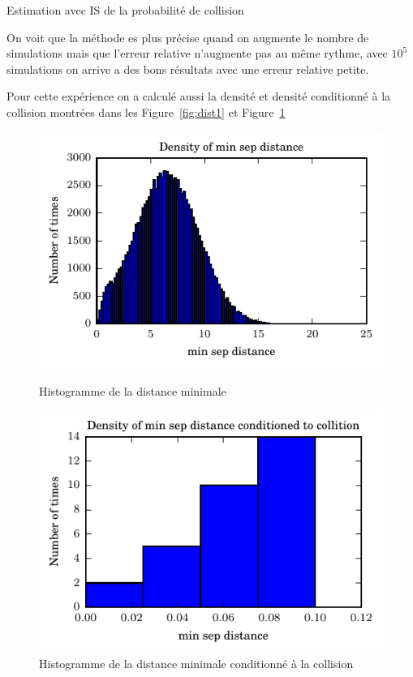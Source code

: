 \documentclass[a4paper, 12pt,twoside]{article}
\numberwithin{equation}{subsection}
\newlength{\mylength}
\begin{document}
	\begin{table}[htbp]
		\begin{center}
		\end{center}
		\caption{Estimation avec IS de la probabilité de collision}
		\label{tab:Isobl}
	\end{table}
	
	On voit que la méthode es plus précise quand on augmente le nombre de simulations mais que l'erreur relative n'augmente pas au même rythme, avec $10^5$ simulations on arrive a des bons résultats avec une erreur relative petite.
	
	Pour cette expérience on a calculé aussi la densité et densité conditionné à la collision montrées dans les Figure~\ref{fig:dist1} et Figure~\ref{fig:dist2}
	
	\begin{figure}[htbp]
		\centering
		\begin{minipage}[b]{\mylength}
			\includegraphics[width=\textwidth]{Images/Script_6_5}
			\caption{Histogramme de la distance minimale}
			\label{fig:dist1}
		\end{minipage}
		\begin{minipage}[b]{\mylength}
			\includegraphics[width=\textwidth]{Images/Script_6_4}
			\caption{Histogramme de la distance minimale conditionné à la collision}
			\label{fig:dist2}
		\end{minipage}
	\end{figure}
	
\end{document}
